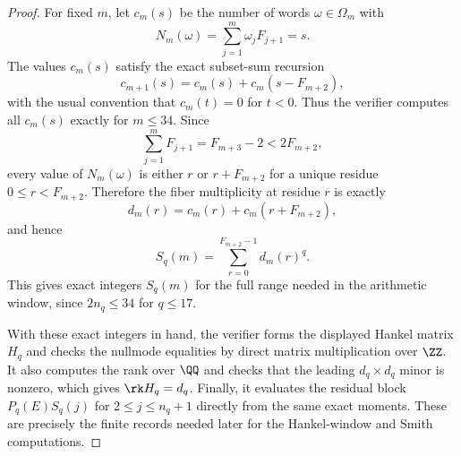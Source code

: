 \begin{proof}
For fixed \(m\), let \(c_m(s)\) be the number of words
\(\omega\in\Omega_m\) with
\[
  N_m(\omega)=\sum_{j=1}^m \omega_jF_{j+1}=s.
\]
The values \(c_m(s)\) satisfy the exact subset-sum recursion
\[
  c_{m+1}(s)=c_m(s)+c_m(s-F_{m+2}),
\]
with the usual convention that \(c_m(t)=0\) for \(t<0\).  Thus the verifier
computes all \(c_m(s)\) exactly for \(m\le 34\).  Since
\[
  \sum_{j=1}^m F_{j+1}=F_{m+3}-2<2F_{m+2},
\]
every value of \(N_m(\omega)\) is either \(r\) or \(r+F_{m+2}\) for a unique
residue \(0\le r<F_{m+2}\).  Therefore the fiber multiplicity at residue \(r\)
is exactly
\[
  d_m(r)=c_m(r)+c_m(r+F_{m+2}),
\]
and hence
\[
  S_q(m)=\sum_{r=0}^{F_{m+2}-1} d_m(r)^q.
\]
This gives exact integers \(S_q(m)\) for the full range needed in the
arithmetic window, since \(2n_q\le 34\) for \(q\le 17\).

With these exact integers in hand, the verifier forms the displayed Hankel
matrix \(H_q\) and checks the nullmode equalities by direct matrix
multiplication over \(\ZZ\).  It also computes the rank over \(\QQ\) and checks
that the leading \(d_q\times d_q\) minor is nonzero, which gives
\(\rk H_q=d_q\).  Finally, it evaluates the residual block
\(P_q(E)S_q(j)\) for \(2\le j\le n_q+1\) directly from the same exact moments.
These are precisely the finite records needed later for the Hankel-window and
Smith computations.
\end{proof}

